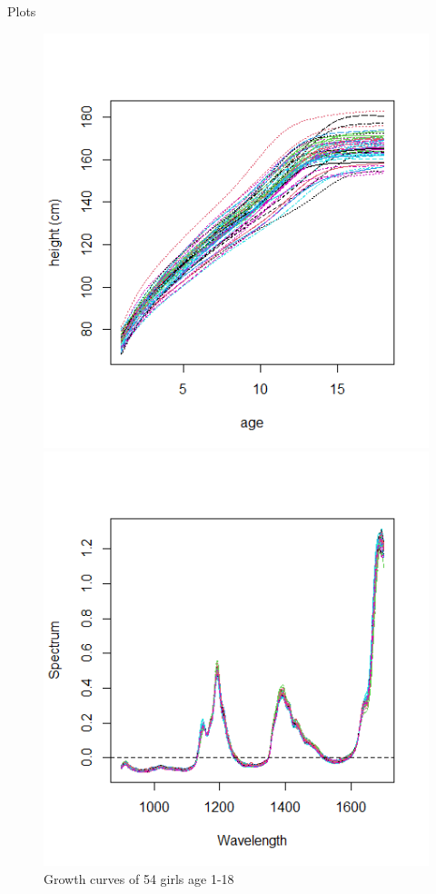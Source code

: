 \documentclass{beamer}
\begin{document}
	\begin{frame}{Plots}
		\begin{figure}
			\centering
			\begin{minipage}{.5\textwidth}
				\centering
				\includegraphics[width=\textwidth]{../Graphics/Growth_curves.png}
				\caption{\tiny Growth curves of 54 girls age 1-18}
			\end{minipage}%
			\begin{minipage}{.5\textwidth}
				\centering
				\includegraphics[width=\textwidth]{../Graphics/NIR.png}

\end{minipage}
\end{figure}
\end{frame}
\end{document}
